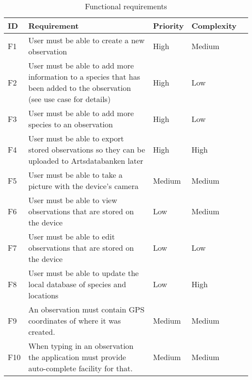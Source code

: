 \begin{table}[h!]
	\begin{tabular}[t]{|l|p{}|l|l|p{}|}\hline
	\bf ID&\bf Requirement& \bf Priority& \bf Complexity\\\hline
	F1&User must be able to create a new observation &High&Medium\\\hline
	F2&User must be able to add more information to a species that has been added to the observation (see use case for details) 	&High&Low\\\hline
	F3&User must be able to add more species to an observation &High&Low\\\hline
	F4&User must be able to export stored observations so they can be uploaded to Artsdatabanken later &High&High\\\hline
	F5&User must be able to take a picture with the device's camera &Medium&Medium\\\hline
	F6&User must be able to view observations that are stored on the device &Low&Medium\\\hline
	F7&User must be able to edit observations that are stored on the device &Low&Low\\\hline
	F8&User must be able to update the local database of species and locations &Low&High\\\hline
	F9&An observation must contain GPS coordinates of where it was created. &Medium&Medium\\\hline
	F10&When typing in an observation the application must provide auto-complete facility for that. &Medium&Medium\\\hline
	\end{tabular}
	\caption{Functional requirements}
	\label{funcreqs}
\end{table}
